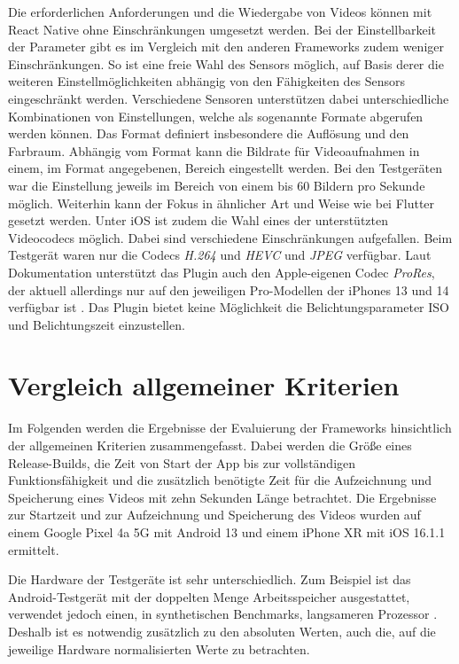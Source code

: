 Die erforderlichen Anforderungen und die Wiedergabe von Videos können mit React Native ohne Einschränkungen umgesetzt werden.
Bei der Einstellbarkeit der Parameter gibt es im Vergleich mit den anderen Frameworks zudem weniger Einschränkungen.
So ist eine freie Wahl des Sensors möglich, auf Basis derer die weiteren Einstellmöglichkeiten abhängig von den Fähigkeiten des Sensors eingeschränkt werden.
Verschiedene Sensoren unterstützen dabei unterschiedliche Kombinationen von Einstellungen, welche als sogenannte Formate abgerufen werden können.
Das Format definiert insbesondere die Auflösung und den Farbraum.
Abhängig vom Format kann die Bildrate für Videoaufnahmen in einem, im Format angegebenen, Bereich eingestellt werden.
Bei den Testgeräten war die Einstellung jeweils im Bereich von einem bis 60 Bildern pro Sekunde möglich.
Weiterhin kann der Fokus in ähnlicher Art und Weise wie bei Flutter gesetzt werden.
Unter iOS ist zudem die Wahl eines der unterstützten Videocodecs möglich.
Dabei sind verschiedene Einschränkungen aufgefallen.
Beim Testgerät waren nur die Codecs \textit{H.264} und \textit{HEVC} und \textit{JPEG} verfügbar.
Laut Dokumentation unterstützt das Plugin auch den Apple-eigenen Codec \textit{ProRes}, der aktuell allerdings nur auf den jeweiligen Pro-Modellen der iPhones 13 und 14 verfügbar ist \cite{Prores_iPhone13}.
Das Plugin bietet keine Möglichkeit die Belichtungsparameter ISO und Belichtungszeit einzustellen.


\section{Vergleich allgemeiner Kriterien}
\label{sec:evaluation_allgemein}

Im Folgenden werden die Ergebnisse der Evaluierung der Frameworks hinsichtlich der allgemeinen Kriterien zusammengefasst.
Dabei werden die Größe eines Release-Builds, die Zeit von Start der App bis zur vollständigen Funktionsfähigkeit und die zusätzlich benötigte Zeit für die Aufzeichnung und Speicherung eines Videos mit zehn Sekunden Länge betrachtet.
Die Ergebnisse zur Startzeit und zur Aufzeichnung und Speicherung des Videos wurden auf einem Google Pixel 4a 5G mit Android 13 und einem iPhone XR mit iOS 16.1.1 ermittelt. 

Die Hardware der Testgeräte ist sehr unterschiedlich.
Zum Beispiel ist das Android-Testgerät mit der doppelten Menge Arbeitsspeicher ausgestattet, verwendet jedoch einen, in synthetischen Benchmarks, langsameren Prozessor \cite{Comparison_Phones}.
Deshalb ist es notwendig zusätzlich zu den absoluten Werten, auch die, auf die jeweilige Hardware normalisierten Werte zu betrachten.



